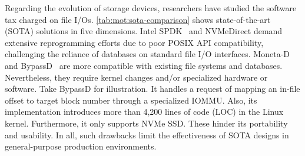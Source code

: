 \iftrue
\vspace{1ex}
\noindent{}
\vspace{0.5ex}
\else 
\ul{$\vmathbb{O4}$. \em
	SOTA designs targeting the software tax have   limitations.}
\fi

Regarding the  evolution of storage devices,
researchers have studied the  software tax charged on file I/Os. %
\autoref{tab:mot:sota-comparison} shows   state-of-the-art (SOTA) solutions in five dimensions. Intel
SPDK~\cite{SSD:SPDK:CloudCom-2017} and NVMeDirect  \cite{SSD:NVMeDirect:HotStorage-2016}  demand 
extensive reprogramming efforts  due to poor POSIX API compatibility, challenging the reliance of databases on standard file I/O interfaces.  %
Moneta-D \cite{SSD:Moneta-D:ASPLOS-2012} and BypassD~\cite{SSD:BypassD:ASPLOS-2024} are more compatible
with existing file systems and   databases. Nevertheless, they  require kernel changes and/or specialized hardware or 
software. %
Take BypassD for illustration. It handles a request of mapping an in-file offset to  target block number through
a specialized IOMMU. Also, its implementation introduces more than 4,200 lines of code (LOC) in the Linux kernel.
  Furthermore, it only supports NVMe SSD.
 These
hinder its portability and usability. 
In all,
such drawbacks   limit the effectiveness of SOTA designs in general-purpose  production environments.




